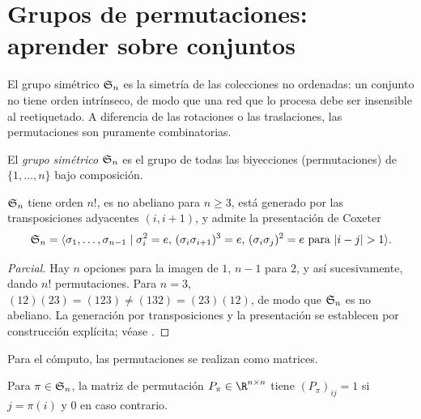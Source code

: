 \section{Grupos de permutaciones: aprender sobre conjuntos}
\label{sec:groups:permutations}

El grupo sim\'etrico $\mathfrak{S}_n$ es la simetr\'ia de las colecciones no ordenadas:
un conjunto no tiene orden intr\'inseco, de modo que una red que lo procesa debe
ser insensible al reetiquetado. A diferencia de las rotaciones o las
traslaciones, las permutaciones son puramente combinatorias.

\begin{definition}
\label{def:groups:symmetric-group}
El \emph{grupo sim\'etrico} $\mathfrak{S}_n$ es el grupo de todas las biyecciones
(permutaciones) de $\{1, \dots, n\}$ bajo composici\'on.
\end{definition}

\begin{proposition}
\label{prop:groups:sn-properties}
$\mathfrak{S}_n$ tiene orden $n!$, es no abeliano para $n \geq 3$, est\'a generado por
las transposiciones adyacentes $(i, i+1)$, y admite la presentaci\'on de Coxeter
\begin{equation}
  \mathfrak{S}_n = \langle \sigma_1, \dots, \sigma_{n-1} \mid \sigma_i^2 = e,\,
    (\sigma_i \sigma_{i+1})^3 = e,\, (\sigma_i \sigma_j)^2 = e \text{ para }
    |i-j| > 1 \rangle.
\end{equation}
\end{proposition}

\begin{proof}[Parcial]
Hay $n$ opciones para la imagen de $1$, $n-1$ para $2$, y as\'i sucesivamente,
dando $n!$ permutaciones. Para $n = 3$, $(12)(23) = (123) \neq (132) = (23)(12)$,
de modo que $\mathfrak{S}_n$ es no abeliano. La generaci\'on por transposiciones y la
presentaci\'on se establecen por construcci\'on expl\'icita; v\'ease
\citet{dummit2004abstract}.
\end{proof}

Para el c\'omputo, las permutaciones se realizan como matrices.

\begin{definition}
\label{def:groups:permutation-matrix}
Para $\pi \in \mathfrak{S}_n$, la matriz de permutaci\'on $P_\pi \in \R^{n \times n}$
tiene $(P_\pi)_{ij} = 1$ si $j = \pi(i)$ y $0$ en caso contrario.
\end{definition}

